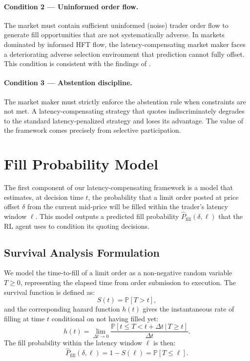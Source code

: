 \documentclass[12pt]{article}
\newcommand{\pfill}{\hat{P}_{\mathrm{fill}}}
\newcommand{\given}{\,|\,}
\begin{document}
\paragraph{Condition 2 --- Uninformed order flow.} The market must contain sufficient uninformed (noise) trader order flow to generate fill opportunities that are not systematically adverse. In markets dominated by informed HFT flow, the latency-compensating market maker faces a deteriorating adverse selection environment that prediction cannot fully offset. This condition is consistent with the findings of \citet{chen2018}.

\paragraph{Condition 3 --- Abstention discipline.} The market maker must strictly enforce the abstention rule when constraints are not met. A latency-compensating strategy that quotes indiscriminately degrades to the standard latency-penalized strategy and loses its advantage. The value of the framework comes precisely from selective participation.

\section{Fill Probability Model}
\label{sec:fillmodel}

The first component of our latency-compensating framework is a model that estimates, at decision time $t$, the probability that a limit order posted at price offset $\delta$ from the current mid-price will be filled within the trader's latency window $\ell$. This model outputs a predicted fill probability $\pfill(\delta, \ell)$ that the RL agent uses to condition its quoting decisions.

\subsection{Survival Analysis Formulation}

We model the time-to-fill of a limit order as a non-negative random variable $T \geq 0$, representing the elapsed time from order submission to execution. The survival function is defined as:
\begin{equation}
  S(t) = \mathbb{P}[T > t],
\end{equation}
and the corresponding hazard function $h(t)$ gives the instantaneous rate of filling at time $t$ conditional on not having filled yet:
\begin{equation}
  h(t) = \lim_{\Delta t \to 0} \frac{\mathbb{P}[t \leq T < t + \Delta t \given T \geq t]}{\Delta t}.
\end{equation}
The fill probability within the latency window $\ell$ is then:
\begin{equation}
  \pfill(\delta, \ell) = 1 - S(\ell) = \mathbb{P}[T \leq \ell].
\end{equation}
\end{document}
